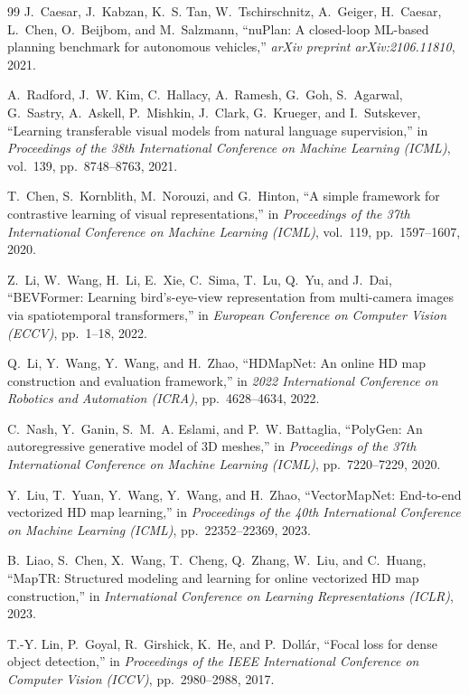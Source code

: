\documentclass{book}
\begin{document}
\begin{thebibliography}{99}
J.~Caesar, J.~Kabzan, K.~S. Tan, W.~Tschirschnitz, A.~Geiger, H.~Caesar, L.~Chen, O.~Beijbom, and M.~Salzmann, ``nuPlan: A closed-loop ML-based planning benchmark for autonomous vehicles,'' \textit{arXiv preprint arXiv:2106.11810}, 2021.
 
A.~Radford, J.~W. Kim, C.~Hallacy, A.~Ramesh, G.~Goh, S.~Agarwal, G.~Sastry, A.~Askell, P.~Mishkin, J.~Clark, G.~Krueger, and I.~Sutskever, ``Learning transferable visual models from natural language supervision,'' in \textit{Proceedings of the 38th International Conference on Machine Learning (ICML)}, vol.~139, pp.~8748--8763, 2021.
 
T.~Chen, S.~Kornblith, M.~Norouzi, and G.~Hinton, ``A simple framework for contrastive learning of visual representations,'' in \textit{Proceedings of the 37th International Conference on Machine Learning (ICML)}, vol.~119, pp.~1597--1607, 2020.
 
Z.~Li, W.~Wang, H.~Li, E.~Xie, C.~Sima, T.~Lu, Q.~Yu, and J.~Dai, ``BEVFormer: Learning bird's-eye-view representation from multi-camera images via spatiotemporal transformers,'' in \textit{European Conference on Computer Vision (ECCV)}, pp.~1--18, 2022.
 
Q.~Li, Y.~Wang, Y.~Wang, and H.~Zhao, ``HDMapNet: An online HD map construction and evaluation framework,'' in \textit{2022 International Conference on Robotics and Automation (ICRA)}, pp.~4628--4634, 2022.
 
C.~Nash, Y.~Ganin, S.~M.~A. Eslami, and P.~W. Battaglia, ``PolyGen: An autoregressive generative model of 3D meshes,'' in \textit{Proceedings of the 37th International Conference on Machine Learning (ICML)}, pp.~7220--7229, 2020.
 
Y.~Liu, T.~Yuan, Y.~Wang, Y.~Wang, and H.~Zhao, ``VectorMapNet: End-to-end vectorized HD map learning,'' in \textit{Proceedings of the 40th International Conference on Machine Learning (ICML)}, pp.~22352--22369, 2023.
 
B.~Liao, S.~Chen, X.~Wang, T.~Cheng, Q.~Zhang, W.~Liu, and C.~Huang, ``MapTR: Structured modeling and learning for online vectorized HD map construction,'' in \textit{International Conference on Learning Representations (ICLR)}, 2023.
 
T.-Y. Lin, P.~Goyal, R.~Girshick, K.~He, and P.~Doll{\'a}r, ``Focal loss for dense object detection,'' in \textit{Proceedings of the IEEE International Conference on Computer Vision (ICCV)}, pp.~2980--2988, 2017.
 

\end{thebibliography}
\end{document}
